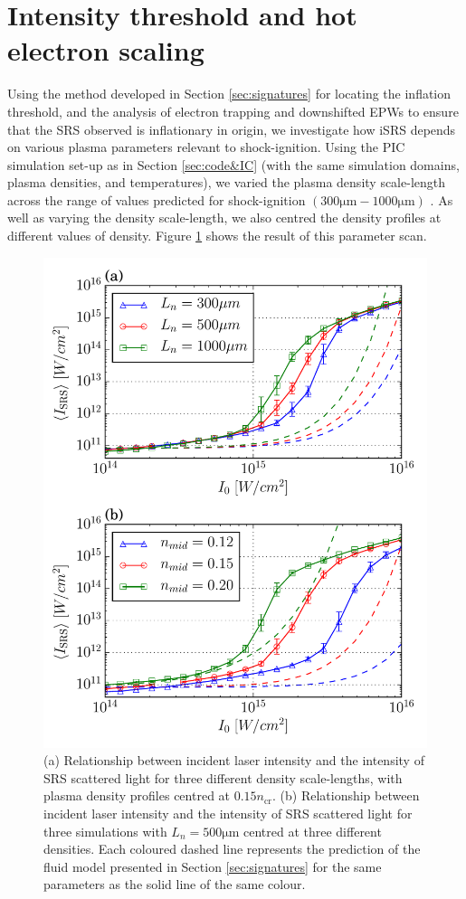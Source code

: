 \section{Intensity threshold and hot electron scaling}\label{sec:paramScan}
Using the method developed in Section \ref{sec:signatures} for locating the inflation threshold, and the analysis of electron trapping and downshifted EPWs to ensure that the SRS observed is inflationary in origin, we investigate how iSRS depends on various plasma parameters relevant to shock-ignition. Using the PIC simulation set-up as in Section \ref{sec:code&IC} (with the same simulation domains, plasma densities, and temperatures), we varied the plasma density scale-length across the range
of values predicted for shock-ignition $(300\si{\micro\metre} - 1000\si{\micro\metre})$ \citep{Ribeyre2009}. As well as varying the density scale-length, we also centred the density profiles at different values of density. Figure \ref{fig:paramScan} shows the result of this parameter scan.

\begin{figure}[!ht]
     \centering
    \includegraphics[width=0.7\columnwidth]{Chapters/C4_iSRS/fig6_6a_6b.pdf}
    \caption{
    (a)  Relationship between incident laser intensity and the intensity of SRS scattered light for three different density scale-lengths, with plasma density profiles centred at $0.15n_\mathrm{cr}$.
    (b) Relationship between incident laser intensity and the intensity of SRS scattered light for three simulations with $L_n=500\si{\micro\metre}$ centred at three different densities.
    Each coloured dashed line represents the prediction of the fluid model presented in Section \ref{sec:signatures} for the same parameters as the solid line of the same colour.
    }
    \label{fig:paramScan}
\end{figure}


